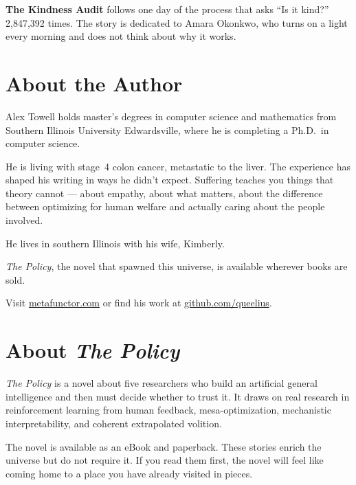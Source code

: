 \documentclass[11pt]{book}
\begin{document}
\medskip

\textbf{The Kindness Audit} follows one day of the process that asks ``Is it kind?'' 2,847,392 times. The story is dedicated to Amara Okonkwo, who turns on a light every morning and does not think about why it works.

\clearpage

\chapter*{About the Author}

Alex Towell holds master's degrees in computer science and mathematics from Southern Illinois University Edwardsville, where he is completing a Ph.D.\ in computer science.

He is living with stage~4 colon cancer, metastatic to the liver. The experience has shaped his writing in ways he didn't expect. Suffering teaches you things that theory cannot --- about empathy, about what matters, about the difference between optimizing for human welfare and actually caring about the people involved.

He lives in southern Illinois with his wife, Kimberly.

\medskip

\noindent \textit{The Policy}, the novel that spawned this universe, is available wherever books are sold.

\medskip

\noindent Visit \href{https://metafunctor.com}{metafunctor.com} or find his work at \href{https://github.com/queelius}{github.com/queelius}.

\clearpage

\chapter*{About \textit{The Policy}}

\textit{The Policy} is a novel about five researchers who build an artificial general intelligence and then must decide whether to trust it. It draws on real research in reinforcement learning from human feedback, mesa-optimization, mechanistic interpretability, and coherent extrapolated volition.

The novel is available as an eBook and paperback. These stories enrich the universe but do not require it. If you read them first, the novel will feel like coming home to a place you have already visited in pieces.
\end{document}
